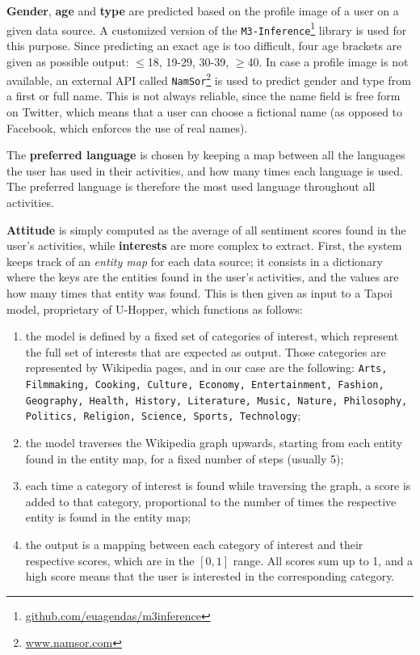 \textbf{Gender}, \textbf{age} and \textbf{type} are predicted based on the profile image of a user on a given data source. A customized version of the \texttt{M3-Inference}\footnote{\url{github.com/euagendas/m3inference}} library is used for this purpose. Since predicting an exact age is too difficult, four age brackets are given as possible output: $\leq$18, 19-29, 30-39, $\geq$40. In case a profile image is not available, an external API called \texttt{NamSor}\footnote{\url{www.namsor.com}} is used to predict gender and type from a first or full name. This is not always reliable, since the name field is free form on Twitter, which means that a user can choose a fictional name (as opposed to Facebook, which enforces the use of real names).

The \textbf{preferred language} is chosen by keeping a map between all the languages the user has used in their activities, and how many times each language is used. The preferred language is therefore the most used language throughout all activities.

\textbf{Attitude} is simply computed as the average of all sentiment scores found in the user's activities, while \textbf{interests} are more complex to extract. First, the system keeps track of an \emph{entity map} for each data source; it consists in a dictionary where the keys are the entities found in the user's activities, and the values are how many times that entity was found. This is then given as input to a Tapoi model, proprietary of U-Hopper, which functions as follows:
\begin{enumerate}
    \item the model is defined by a fixed set of categories of interest, which represent the full set of interests that are expected as output. Those categories are represented by Wikipedia pages, and in our case are the following: \texttt{Arts, Filmmaking, Cooking, Culture, Economy, Entertainment, Fashion, Geography, Health, History, Literature, Music, Nature, Philosophy, Po\-li\-tics, Religion, Science, Sports, Technology};
    \item the model traverses the Wikipedia graph upwards, starting from each entity found in the entity map, for a fixed number of steps (usually 5);
    \item each time a category of interest is found while traversing the graph, a score is added to that category, proportional to the number of times the respective entity is found in the entity map;
    \item the output is a mapping between each category of interest and their respective scores, which are in the $[0,1]$ range. All scores sum up to 1, and a high score means that the user is interested in the corresponding category.
\end{enumerate}

